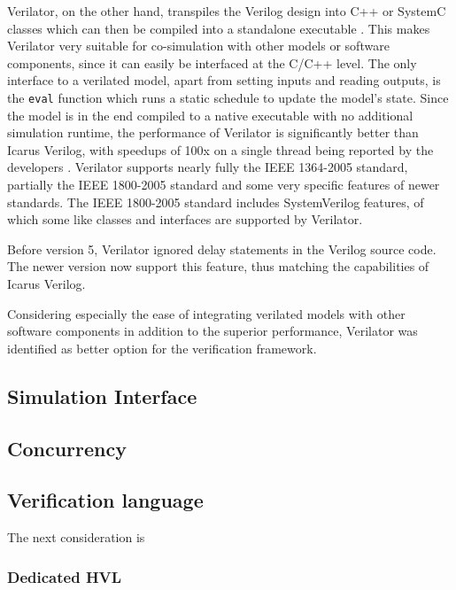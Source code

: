 \documentclass[12pt]{report}
\begin{document}
Verilator, on the other hand, transpiles the Verilog design into C++ or SystemC classes which can then be compiled
into a standalone executable \cite{verilator}. This makes Verilator very suitable for co-simulation with other models
or software components, since it can easily be interfaced at the C/C++ level. The only interface to a verilated
model, apart from setting inputs and reading outputs, is the \texttt{eval} function which runs a static schedule to
update the model's state. Since the model is in the end compiled to a native executable with no additional simulation
runtime, the performance of Verilator is significantly better than Icarus Verilog, with speedups of 100x on a single
thread being reported by the developers \cite{verilator}. Verilator supports nearly fully the IEEE 1364-2005
standard, partially the IEEE 1800-2005 standard and some very specific features of newer standards. The IEEE
1800-2005 standard includes SystemVerilog features, of which some like classes and interfaces are supported by Verilator.

Before version 5, Verilator ignored delay statements in the Verilog source code. The newer version now support this
feature, thus matching the capabilities of Icarus Verilog.

Considering especially the ease of integrating verilated models with other software components in addition to the
superior performance, Verilator was identified as better option for the verification framework.

\subsection{Simulation Interface} %

\subsection{Concurrency} %

\subsection{Verification language} %
The next consideration is

\subsubsection{Dedicated HVL}
\end{document}
